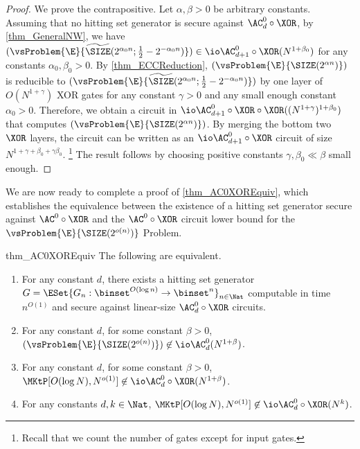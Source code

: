 \documentclass[11pt]{article}
\numberwithin{equation}{section}
\theoremstyle{definition}
\theoremstyle{plain}
\begin{document}
\begin{proof}
  We prove the contrapositive.
  Let $\alpha, \beta > 0$ be arbitrary constants.
  Assuming that no hitting set generator is secure against $\AC^0_d \circ \XOR$,
  by \cref{thm_GeneralNW}, we have
  $(\vsProblem{\E}{\widetilde{\SIZE} (2^{\alpha_0 n} ; \frac{1}{2} - 2^{- \alpha_0 n})}) \in \io \AC^0_{d+1} \circ \XOR (N^{1 + \beta_0})$
  for any constants $\alpha_0, \beta_0 > 0$.
  By \cref{thm_ECCReduction},
  $(\vsProblem{\E}{{\SIZE}(2^{\alpha n})})$
  is reducible to
  $(\vsProblem{\E}{\widetilde{\SIZE}(2^{\alpha_0 n}; \frac{1}{2} - 2^{-\alpha_0 n})})$
  by one layer of $O(N^{1 + \gamma})$ XOR gates
  for any constant $\gamma > 0$ and any small enough constant $\alpha_0 > 0$.
  Therefore,
  we obtain
  a circuit in $\io\AC^0_{d+1} \circ \XOR \circ \XOR((N^{1 + \gamma})^{1 + \beta_0})$
  that computes
  $(\vsProblem{\E}{{\SIZE}(2^{\alpha n})})$.
  By merging the bottom two $\XOR$ layers,
  the circuit can be written as an $\io\AC^0_{d+1} \circ \XOR$ circuit of size $N^{1 + \gamma + \beta_0 + \gamma \beta_0}$.%
  \footnote{
    Recall that we count the number of gates except for input gates.
  }
  The result follows by choosing positive constants $\gamma, \beta_0 \ll \beta$ small enough.
\end{proof}

We are now ready to complete a proof of \cref{thm_AC0XOREquiv}, which establishes the equivalence between
the existence of a hitting set generator secure against $\AC^0 \circ \XOR$
and the $\AC^0 \circ \XOR$ circuit lower bound for the $\vsProblem{\E}{{\SIZE}(2^{o(n)})}$ Problem.

\begin{restatetheorem}
  {thm_AC0XOREquiv}
  The following are equivalent.
  \begin{enumerate}
    \item
          \label{item_HSGagainstAC0XORRestated}
          For any constant $d$,
          there exists a hitting set generator $G = \ESet{ G_n : \binset^{O(\log n)} \to \binset^n }_{n \in \Nat} $ computable in time $n^{O(1)}$ and secure against linear-size $\AC_d^0 \circ \XOR$ circuits.
    \item
          \label{item_EvsSIZERestated}
          For any constant $d$,
          for some constant $\beta > 0$,
          $(\vsProblem{\E}{\SIZE (2^{o(n)})}) \not\in \io\AC^0_d(N^{1 + \beta})$.
    \item
          \label{item_EvsKtRestated}
          For any constant $d$, for some constant $\beta > 0$,
          $\MKtP[O(\log N), N^{o(1)}] \not\in \io\AC^0_d \circ \XOR (N^{1 + \beta})$.
    \item
          \label{item_EvsKtLargeRestated}
          For any constants $d, k \in \Nat$,
          $\MKtP[O(\log N), N^{o(1)}] \not\in \io\AC^0_d \circ \XOR (N^k)$.
  \end{enumerate}
\end{restatetheorem}
\end{document}
